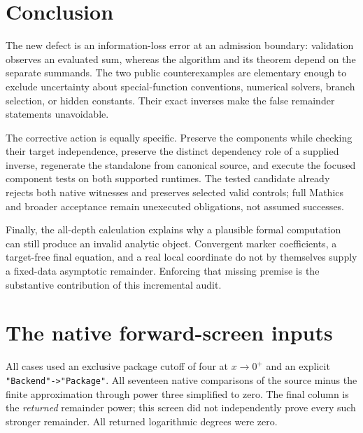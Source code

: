 \documentclass[11pt,letterpaper]{article}
\theoremstyle{remark}\newtheorem{remark}[theorem]{Remark}
\newcommand{\code}[1]{\texttt{#1}}
\begin{document}
\section{Conclusion}
The new defect is an information-loss error at an admission boundary: validation
observes an evaluated sum, whereas the algorithm and its theorem depend on the
separate summands. The two public counterexamples are elementary enough to
exclude uncertainty about special-function conventions, numerical solvers,
branch selection, or hidden constants. Their exact inverses make the false
remainder statements unavoidable.

The corrective action is equally specific. Preserve the components while
checking their target independence, preserve the distinct dependency role of a
supplied inverse, regenerate the standalone from canonical source, and execute
the focused component tests on both supported runtimes. The tested candidate
already rejects both native witnesses and preserves selected valid controls;
full Mathics and broader acceptance remain unexecuted obligations, not assumed
successes.

Finally, the all-depth calculation explains why a plausible formal computation
can still produce an invalid analytic object. Convergent marker coefficients,
a target-free final equation, and a real local coordinate do not by themselves
supply a fixed-data asymptotic remainder. Enforcing that missing premise is the
substantive contribution of this incremental audit.

\appendix
\section{The native forward-screen inputs}\label{app:screen}
All cases used an exclusive package cutoff of four at $x\to0^+$ and an
explicit \code{"Backend"->"Package"}. All seventeen native comparisons of
the source minus the finite approximation through power three simplified to
zero. The final column is the \emph{returned} remainder power; this screen did
not independently prove every such stronger remainder. All returned logarithmic
degrees were zero.
\end{document}

